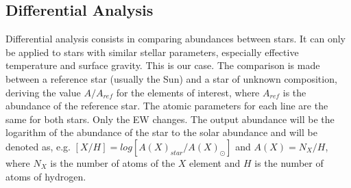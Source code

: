 \documentclass[dvips,12pt,a4paper]{report}
\begin{document}
{%







\subsection {Differential Analysis}
\label {difanal}


Differential analysis consists in comparing abundances between stars. It can only be applied to stars with similar stellar parameters, especially effective temperature and surface gravity. This is our case.  The comparison is made between a reference star (usually the Sun) and a star of unknown composition, deriving the value $A/A_{ref}$ for the elements of interest, where $A_{ref}$ is the abundance of the reference star. The atomic parameters for each line are the same for both stars. Only the EW changes. The output abundance will be the logarithm of the abundance of the star to the solar abundance and will be denoted as, e.g. $[X/H]=log[A(X)_{star}/A(X)_\odot]$ and $A(X)=N_X/H$, where $N_X$ is the number of atoms of the $X$ element and $H$ is the number of atoms of hydrogen. %

}
\end{document}

